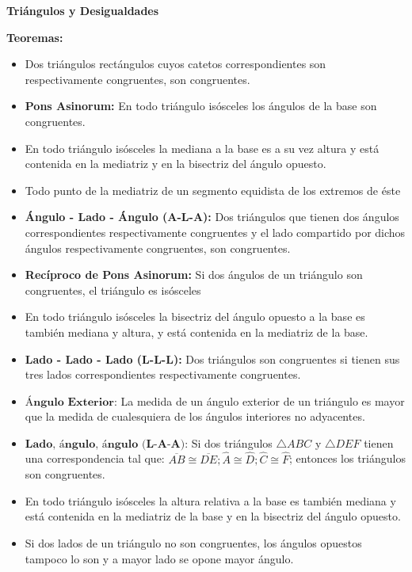 \documentclass[•]{article}
\begin{document}
	\begin{center}
		\Large{\textbf{Tri\'angulos y Desigualdades}}
	\end{center}

\textbf{Teoremas:}	
\begin{itemize}
	\item Dos tri\'angulos rect\'angulos cuyos catetos correspondientes son respectivamente congruentes, son congruentes.
	\item \textbf{Pons Asinorum:} En todo tri\'angulo is\'osceles los \'angulos de la base son congruentes.
	\item En todo tri\'angulo is\'osceles la mediana a la base es a su vez altura y est\'a contenida en la mediatriz y en la bisectriz del \'angulo opuesto.
	\item Todo punto de la mediatriz de un segmento equidista de los extremos de \'este
	\item \textbf{\'Angulo - Lado - \'Angulo (A-L-A):} Dos tri\'angulos que tienen dos \'angulos correspondientes respectivamente congruentes y el lado compartido por dichos \'angulos respectivamente congruentes, son congruentes. 
	\item \textbf{Rec\'iproco de Pons Asinorum:} Si dos \'angulos de un tri\'angulo son congruentes, el tri\'angulo es is\'osceles
	\item En todo tri\'angulo is\'osceles la bisectriz del \'angulo opuesto a la base es tambi\'en mediana y altura, y est\'a contenida en la mediatriz de la base.
	\item \textbf{Lado - Lado - Lado (L-L-L):} Dos tri\'angulos son congruentes si tienen sus tres lados correspondientes respectivamente congruentes.
	\item $\textbf{\'Angulo Exterior}$: La medida de un \'angulo exterior de un tri\'angulo es mayor que la medida de cualesquiera de los \'angulos interiores no adyacentes.
	\item $\textbf{Lado, \'angulo, \'angulo (L-A-A)}$: Si dos tri\'angulos $\bigtriangleup ABC$ y $\bigtriangleup DEF$ tienen una correspondencia tal que: $\overline{AB} \cong  \overline{DE}; \hat{A} \cong \hat{D}; \hat{C} \cong \hat{F}$; entonces los tri\'angulos son congruentes.
	\item En todo tri\'angulo is\'osceles la altura relativa a la base es tambi\'en mediana y est\'a contenida en la mediatriz de la base y en la bisectriz del \'angulo opuesto.
	\item Si dos lados de un tri\'angulo no son congruentes, los \'angulos opuestos tampoco lo son y a mayor lado se opone mayor \'angulo.

\end{itemize}
\end{document}
